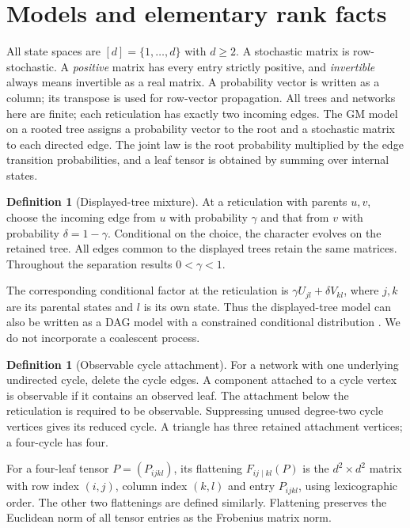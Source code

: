 \documentclass[11pt]{article}
\theoremstyle{definition}
\newtheorem{definition}[theorem]{Definition}
\theoremstyle{remark}
\begin{document}
\section{Models and elementary rank facts}\label{sec:models}

All state spaces are $[d]=\{1,\ldots,d\}$ with $d\ge2$. A stochastic matrix
is row-stochastic. A \emph{positive} matrix has every entry strictly
positive, and \emph{invertible} always means invertible as a real matrix.
A probability vector is written as a column; its transpose is used for
row-vector propagation. All trees and networks here are finite; each
reticulation has exactly two incoming edges. The GM model on a rooted tree assigns a probability
vector to the root and a stochastic matrix to each directed edge. The joint
law is the root probability multiplied by the edge transition probabilities,
and a leaf tensor is obtained by summing over internal states.

\begin{definition}[Displayed-tree mixture]
At a reticulation with parents $u,v$, choose the incoming edge from $u$ with
probability $\gamma$ and that from $v$ with probability
$\delta=1-\gamma$. Conditional on the choice, the character evolves on the
retained tree. All edges common to the displayed trees retain the same
matrices. Throughout the separation results $0<\gamma<1$.
\end{definition}

The corresponding conditional factor at the reticulation is
$\gamma U_{jl}+\delta V_{kl}$, where $j,k$ are its parental states and $l$
is its own state. Thus the displayed-tree model can also be written as a
DAG model with a constrained conditional distribution
\cite{Sullivant2026}. We do not incorporate a coalescent process.

\begin{definition}[Observable cycle attachment]
For a network with one underlying undirected cycle, delete the cycle edges.
A component attached to a cycle vertex is observable if it contains an
observed leaf. The attachment below the reticulation is required to be
observable. Suppressing unused degree-two cycle vertices gives its reduced
cycle. A triangle has three retained attachment vertices; a four-cycle has
four.
\end{definition}

For a four-leaf tensor $P=(P_{ijkl})$, its flattening
$F_{ij\mid kl}(P)$ is the $d^2\times d^2$ matrix with row index $(i,j)$,
column index $(k,l)$ and entry $P_{ijkl}$, using lexicographic order.
The other two flattenings are defined similarly. Flattening preserves the
Euclidean norm of all tensor entries as the Frobenius matrix norm.
\end{document}
